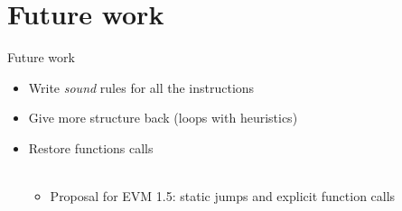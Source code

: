 \documentclass{beamer}
\begin{document}
\part{Future work}
\frame{\partpage}

\begin{frame}{Future work}
	\begin{itemize}
		\item Write \emph{sound} rules for all the instructions
		\item Give more structure back (loops with heuristics)
		\item Restore functions calls
		\\~\\
		\begin{itemize}
			\item<2> Proposal for EVM 1.5: static jumps and explicit function calls
		\end{itemize}
	\end{itemize}
\end{frame}




%
\end{document}
